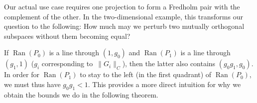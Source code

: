 \documentclass[10pt,a4paper]{amsart}
\numberwithin{equation}{section}
\DeclareMathOperator{\Ran}{Ran}
\begin{document}
		Our actual use case requires one projection to form a Fredholm pair with the complement of the other. In the two-dimensional example, this transforms our question to the following: How much may we perturb two mutually orthogonal subspaces without them becoming equal?

\begin{figure}[ht]\centering
		\end{figure}
		
		If $\Ran(P_0)$ is a line through $(1,g_0)$ and $\Ran(P_1)$ is a line through $(g_1,1)$ ($g_i$ corresponding to~$\|G_i\|_C$), then the latter also contains $(g_0g_1,g_0)$. In order for $\Ran(P_1)$ to stay to the left (in the first quadrant) of $\Ran(P_0)$, we must thus have $g_0g_1<1$. This provides a more direct intuition for why we obtain the bounds we do in the following theorem.
	
\end{document}
